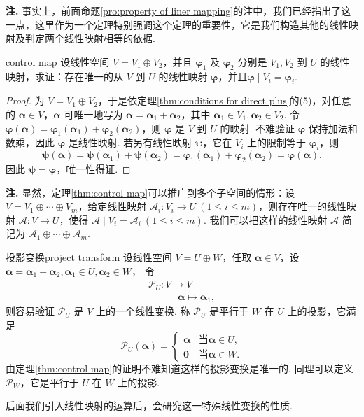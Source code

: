 \documentclass[12pt, a4paper,newtx]{ctexart}
\newenvironment{remark}{\dbend\textbf{注. }}{}{}
\begin{document}
\begin{remark}
	事实上，前面命题\ref{pro:property of liner mapping}的注中，我们已经指出了这一点，这里作为一个定理特别强调这个定理的重要性，它是我们构造其他的线性映射及判定两个线性映射相等的依据. 
\end{remark}
\begin{theorem}{}{control map}
	设线性空间 $V = V_1 \oplus V_2$，并且 $\bm\varphi_1$ 及 $\bm\varphi_2$ 分别是 $V_1, V_2$ 到 $U$ 的线性映射，求证：存在唯一的从 $V$ 到 $U$ 的线性映射 $\bm\varphi$，并且$\bm\varphi\mid V_i=\bm\varphi_i.$
\end{theorem}
\begin{proof}
	为 $V = V_1 \oplus V_2$，于是依定理\ref{thm:conditions for direct plus}的(5)，对任意的 $\bm\alpha \in V$，$\bm\alpha$ 可唯一地写为 $\bm\alpha = \bm\alpha_1 + \bm\alpha_2$，其中 $\bm\alpha_1 \in V_1, \bm\alpha_2 \in V_2$. 令 $\bm\varphi(\bm\alpha) = \bm\varphi_1(\bm\alpha_1) + \bm\varphi_2(\bm\alpha_2)$，则 $\bm\varphi$ 是 $V$ 到 $U$ 的映射. 不难验证 $\bm\varphi$ 保持加法和数乘，因此 $\bm\varphi$ 是线性映射. 若另有线性映射 $\bm\psi$，它在 $V_i$ 上的限制等于 $\bm\varphi_i$，则
	\[
	\bm\psi(\bm\alpha) = \bm\psi(\bm\alpha_1) + \bm\psi(\bm\alpha_2) = \bm\varphi_1(\bm\alpha_1) + \bm\varphi_2(\bm\alpha_2) = \bm\varphi(\bm\alpha).
	\]
	因此 $\bm\psi = \bm\varphi$，唯一性得证. 
\end{proof}
\begin{remark}
	显然，定理\ref{thm:control map}可以推广到多个子空间的情形：设 $V = V_1 \oplus \cdots \oplus V_m$，给定线性映射 $\mathcal A_i : V_i \rightarrow U \ (1 \leqslant i \leqslant m)$，则存在唯一的线性映射 $\mathcal A : V \rightarrow U$，使得 $\mathcal A\mid {V_i} = \mathcal A_i \ (1 \leq i \leq m)$. 我们可以把这样的线性映射 $\mathcal A$ 简记为 $\mathcal A_1 \oplus \cdots \oplus \mathcal A_m$. 
\end{remark}
\begin{definition}{投影变换}{project transform}\kaishu 
	设线性空间 $V = U \oplus W$，任取 $\bm\alpha \in V$，设 $\bm\alpha = \bm\alpha_1 + \bm\alpha_2,\bm\alpha_1 \in U, \bm\alpha_2 \in W$，
	令\begin{gather*}
		\mathcal{P}_U: V \longrightarrow V\\\qquad\quad\bm\alpha \longmapsto \bm\alpha_1, 
	\end{gather*}
	则容易验证 $\mathcal{P}_U$ 是 $V$ 上的一个线性变换. 称 $\mathcal{P}_U$ 是平行于 $W$ 在 $U$ 上的{\heiti 投影}，它满足
	\[
	\mathcal{P}_U(\bm\alpha) = \begin{cases} 
		\bm\alpha & \text{当} \bm\alpha \in U, \\
		\bm0 & \text{当} \bm\alpha \in W.
	\end{cases}
	\]
	由定理\ref{thm:control map}的证明不难知道这样的投影变换是唯一的. 
	同理可以定义$\mathcal{P}_W$，它是平行于 $U$ 在 $W$ 上的{\heiti 投影}. 
\end{definition}
后面我们引入线性映射的运算后，会研究这一特殊线性变换的性质. 
\end{document}
